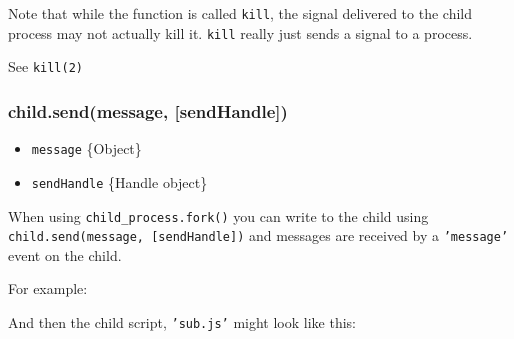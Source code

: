 Note that while the function is called \texttt{kill}, the signal
delivered to the child process may not actually kill it. \texttt{kill}
really just sends a signal to a process.

See \texttt{kill(2)}

\subsubsection{child.send(message,
{[}sendHandle{]})}\label{child.sendmessage-sendhandle}

\begin{itemize}
\itemsep1pt\parskip0pt
\item
  \texttt{message} \{Object\}
\item
  \texttt{sendHandle} \{Handle object\}
\end{itemize}

When using \texttt{child\_process.fork()} you can write to the child
using \texttt{child.send(message, {[}sendHandle{]})} and messages are
received by a \texttt{'message'} event on the child.

For example:

\begin{Shaded}
\begin{Highlighting}[]
 \NormalTok{(}\NormalTok{);}

 \NormalTok{);}

\NormalTok{(}\NormalTok{, }
  \NormalTok{(}
\NormalTok{\});}

\NormalTok{(\{ }\NormalTok{: } \NormalTok{\});}
\end{Highlighting}
\end{Shaded}

And then the child script, \texttt{'sub.js'} might look like this:

\begin{Shaded}
\begin{Highlighting}[]
\NormalTok{(}\NormalTok{, }
  \NormalTok{(}
\NormalTok{\});}

\NormalTok{(\{ }\NormalTok{: } \NormalTok{\});}
\end{Highlighting}
\end{Shaded}

